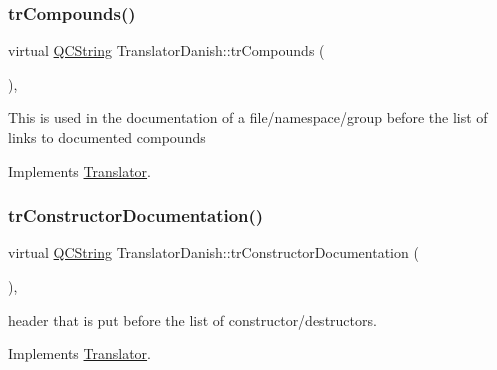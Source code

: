 \mbox{\label{class_translator_danish_a20d7f7a0a8de7b063a7178f77123a9b6}} 
\subsubsection{\texorpdfstring{trCompounds()}{trCompounds()}}
{\footnotesize\ttfamily virtual \mbox{\hyperlink{class_q_c_string}{Q\+C\+String}} Translator\+Danish\+::tr\+Compounds (\begin{DoxyParamCaption}{ }\end{DoxyParamCaption})\hspace{0.3cm}{\ttfamily [inline]}, {\ttfamily [virtual]}}

This is used in the documentation of a file/namespace/group before the list of links to documented compounds 

Implements \mbox{\hyperlink{class_translator}{Translator}}.

\mbox{\label{class_translator_danish_a635196ff77e23ea8cf1d79fecf80bf24}} 
\subsubsection{\texorpdfstring{trConstructorDocumentation()}{trConstructorDocumentation()}}
{\footnotesize\ttfamily virtual \mbox{\hyperlink{class_q_c_string}{Q\+C\+String}} Translator\+Danish\+::tr\+Constructor\+Documentation (\begin{DoxyParamCaption}{ }\end{DoxyParamCaption})\hspace{0.3cm}{\ttfamily [inline]}, {\ttfamily [virtual]}}

header that is put before the list of constructor/destructors. 

Implements \mbox{\hyperlink{class_translator}{Translator}}.

\mbox{\label{class_translator_danish_ae1798ff67ba1e0fbdbba1efe26fcecfa}} 
